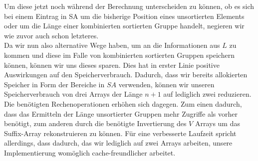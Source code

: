 Um diese jetzt noch während der Berechnung unterscheiden zu können, ob es sich bei einem Eintrag in SA um die bisherige Position eines unsortierten Elements oder um die Länge einer kombinierten sortierten Gruppe handelt, negieren wir wie zuvor auch schon letzteres.\\
Da wir nun also alternative Wege haben, um an die Informationen aus $L$ zu kommen und diese im Falle von kombinierten sortierten Gruppen speichern können, können wir uns dieses sparen. Dies hat in erster Linie positive Auswirkungen auf den Speicherverbrauch. Dadurch, dass wir bereits allokierten Speicher in Form der Bereiche in $SA$ verwenden, können wir unseren Speicherverbrauch von drei Arrays der Länge $n+1$ auf lediglich zwei reduzieren. Die benötigten Rechenoperationen erhöhen sich dagegen. Zum einen dadurch, dass das Ermitteln der Länge unsortierter Gruppen mehr Zugriffe als vorher benötigt, zum anderen durch die benötigte Invertierung des $V$ Arrays um das Suffix-Array rekonstruieren zu können. Für eine verbesserte Laufzeit spricht allerdings, dass dadurch, das wir lediglich auf zwei Arrays arbeiten, unsere Implementierung womöglich cache-freundlicher arbeitet.
